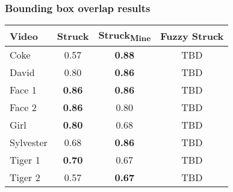\begin{frame}
    \frametitle{Bounding box overlap results}
    \begin{center}
        \begin{tabular}{l c c c }
            \toprule
            Video & Struck\textsubscript{\cite{6126251}} & Struck\textsubscript{Mine} & Fuzzy Struck \\
            \midrule
            Coke      &         0.57  & \textbf{0.88} & TBD \\
            David     &         0.80  & \textbf{0.86} & TBD \\
            Face 1    & \textbf{0.86} & \textbf{0.86} & TBD \\
            Face 2    & \textbf{0.86} &         0.80  & TBD \\
            Girl      & \textbf{0.80} &         0.68  & TBD \\
            Sylvester &         0.68  & \textbf{0.86} & TBD \\
            Tiger 1   & \textbf{0.70} &         0.67  & TBD \\
            Tiger 2   &         0.57  & \textbf{0.67} & TBD \\
            \bottomrule
        \end{tabular}
    \end{center}
\end{frame}

